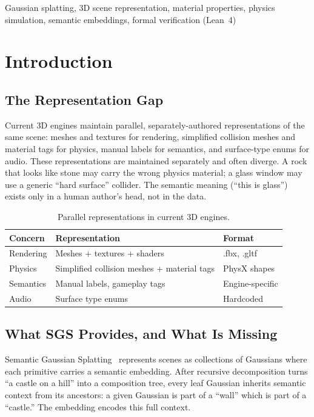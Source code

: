 \documentclass[twoside,11pt]{article}
\begin{document}
\begin{keywords}
  Gaussian splatting, 3D scene representation, material properties, physics simulation, semantic embeddings, formal verification (Lean~4)
\end{keywords}

\section{Introduction}

\subsection{The Representation Gap}

Current 3D engines maintain parallel, separately-authored representations of the same scene: meshes and textures for rendering, simplified collision meshes and material tags for physics, manual labels for semantics, and surface-type enums for audio. These representations are maintained separately and often diverge. A rock that looks like stone may carry the wrong physics material; a glass window may use a generic ``hard surface'' collider. The semantic meaning (``this is glass'') exists only in a human author's head, not in the data.

\begin{table}[t]
\centering
\caption{Parallel representations in current 3D engines.}
\label{tab:parallel}
\begin{tabular}{lll}
\toprule
Concern & Representation & Format \\
\midrule
Rendering & Meshes + textures + shaders & .fbx, .gltf \\
Physics & Simplified collision meshes + material tags & PhysX shapes \\
Semantics & Manual labels, gameplay tags & Engine-specific \\
Audio & Surface type enums & Hardcoded \\
\bottomrule
\end{tabular}
\end{table}

\subsection{What SGS Provides, and What Is Missing}

Semantic Gaussian Splatting~\citep{sgs-repo} represents scenes as collections of Gaussians where each primitive carries a semantic embedding. After recursive decomposition turns ``a castle on a hill'' into a composition tree, every leaf Gaussian inherits semantic context from its ancestors: a given Gaussian is part of a ``wall'' which is part of a ``castle.'' The embedding encodes this full context.
\end{document}
